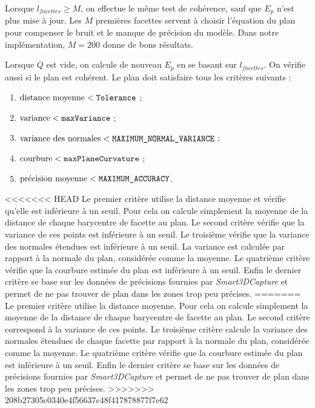 ﻿\documentclass[12pt, twoside]{article}
\begin{document}
Lorsque $l_{facettes} \geq M$, on effectue le même test de cohérence, sauf que $E_p$ n'est plus mise à jour. Les $M$ premières facettes servent à choisir l'équation du plan pour compenser le bruit et le manque de précision du modèle. Dans notre implémentation, $M = 200$ donne de bons résultats.

Lorsque $Q$ est vide, on calcule de nouveau $E_p$ en se basant sur $l_{facettes}$. On vérifie aussi si le plan est cohérent. Le plan doit satisfaire tous les critères suivants :
\begin{enumerate}
  \item $\text{distance moyenne} < \text{\texttt{Tolerance}}$ ;
  \item $\text{variance} < \text{\texttt{maxVariance}}$ ;
  \item $\text{variance des normales} < \text{\texttt{MAXIMUM\_NORMAL\_VARIANCE}}$ ;
  \item $\text{courbure} < \text{\texttt{maxPlaneCurvature}}$ ;
  \item $\text{précision moyenne} < \text{\texttt{MAXIMUM\_ACCURACY}}$.
\end{enumerate}
<<<<<<< HEAD
Le premier critère utilise la distance moyenne et vérifie qu'elle est inférieure à un seuil. Pour cela on calcule simplement la moyenne de la distance de chaque barycentre de facette au plan. Le second critère vérifie que la variance de ces points est inférieure à un seuil. Le troisième vérifie que la variance des normales étendues est inférieure à un seuil. La variance est calculée par rapport à la normale du plan, considérée comme la moyenne. Le quatrième critère vérifie que la courbure estimée du plan est inférieure à un seuil. Enfin le dernier critère se base sur les données de précisions fournies par \textit{Smart3DCapture} et permet de ne pas trouver de plan dans les zones trop peu précises.
=======
Le premier critère utilise la distance moyenne. Pour cela on calcule simplement la moyenne de la distance de chaque barycentre de facette au plan. Le second critère correspond à la variance de ces points. Le troisième critère calcule la variance des normales étendues de chaque facette par rapport à la normale du plan, considérée comme la moyenne. Le quatrième critère vérifie que la courbure estimée du plan est inférieure à un seuil. Enfin le dernier critère se base sur les données de précisions fournies par \textit{Smart3DCapture} et permet de ne pas trouver de plan dans les zones trop peu précises.
>>>>>>> 208b27305c0340e4f56637c48f417878877f7e62
\end{document}
